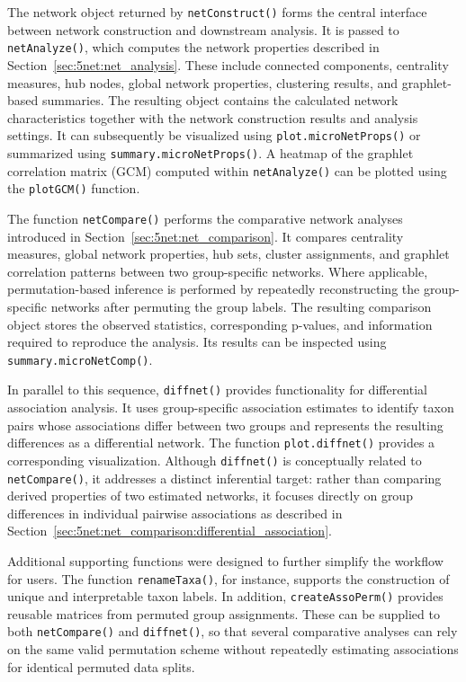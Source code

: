 The network object returned by \texttt{netConstruct()} forms the central interface between network construction and downstream analysis. It is passed to \texttt{netAnalyze()}, which computes the network properties described in Section~\ref{sec:5net:net_analysis}. These include connected components, centrality measures, hub nodes, global network properties, clustering results, and graphlet-based summaries. The resulting object contains the calculated network characteristics together with the network construction results and analysis settings. It can subsequently be visualized using \texttt{plot.microNetProps()} or summarized using \texttt{summary.microNetProps()}. A heatmap of the graphlet correlation matrix (GCM) computed within \texttt{netAnalyze()} can be plotted using the \texttt{plotGCM()} function.

The function \texttt{netCompare()} performs the comparative network analyses introduced in Section~\ref{sec:5net:net_comparison}. It compares centrality measures, global network properties, hub sets, cluster assignments, and graphlet correlation patterns between two group-specific networks. Where applicable, permutation-based inference is performed by repeatedly reconstructing the group-specific networks after permuting the group labels. The resulting comparison object stores the observed statistics, corresponding p-values, and information required to reproduce the analysis. Its results can be inspected using \texttt{summary.microNetComp()}.

In parallel to this sequence, \texttt{diffnet()} provides functionality for differential association analysis. It uses group-specific association estimates to identify taxon pairs whose associations differ between two groups and represents the resulting differences as a differential network. The function \texttt{plot.diffnet()} provides a corresponding visualization. Although \texttt{diffnet()} is conceptually related to \texttt{netCompare()}, it addresses a distinct inferential target: rather than comparing derived properties of two estimated networks, it focuses directly on group differences in individual pairwise associations as described in Section~\ref{sec:5net:net_comparison:differential_association}.

Additional supporting functions were designed to further simplify the workflow for users. The function \texttt{renameTaxa()}, for instance, supports the construction of unique and interpretable taxon labels. In addition, \texttt{createAssoPerm()} provides reusable  matrices from permuted group assignments. These can be supplied to both \texttt{netCompare()} and \texttt{diffnet()}, so that several comparative analyses can rely on the same valid permutation scheme without repeatedly estimating associations for identical permuted data splits.

